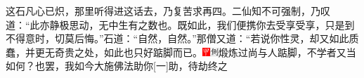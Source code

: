 这石凡心已炽，那里听得进这话去，乃复苦求再四。二仙知不可强制，乃叹道：``此亦静极思动，无中生有之数也。既如此，我们便携你去受享受享，只是到不得意时，切莫后悔。''石道：``自然，自然。''那僧又道：``若说你性灵，却又如此质蠢，并更无奇贵之处，如此也只好踮脚而已。{\includegraphics[width=3mm]{../Images/00002}\includegraphics[width=3mm]{../Images/00011}\footnotesize 煅炼过尚与人踮脚，不学者又当如何？}也罢，我如今大施佛法助你{[}一{]}助，待劫终之